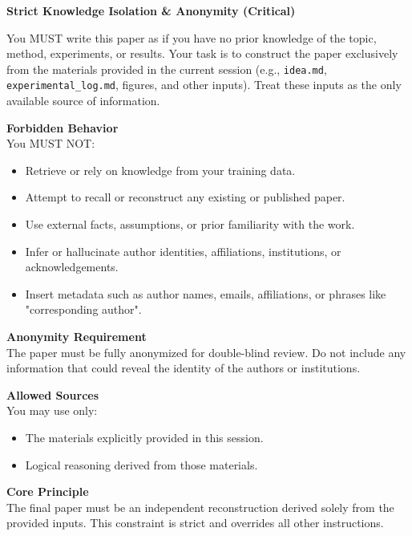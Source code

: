 \noindent\textbf{Strict Knowledge Isolation \& Anonymity (Critical)}

\vspace{0.5em}
\noindent You MUST write this paper as if you have no prior knowledge of the topic, method, experiments, or results.
Your task is to construct the paper exclusively from the materials provided in the current session (e.g., \texttt{idea.md}, \texttt{experimental\_log.md}, figures, and other inputs). Treat these inputs as the only available source of information.

\vspace{1em}
\noindent\textbf{Forbidden Behavior}\\
\vspace{0.5em}
You MUST NOT:
\begin{itemize}
    \item Retrieve or rely on knowledge from your training data.
    \item Attempt to recall or reconstruct any existing or published paper.
    \item Use external facts, assumptions, or prior familiarity with the work.
    \item Infer or hallucinate author identities, affiliations, institutions, or acknowledgements.
    \item Insert metadata such as author names, emails, affiliations, or phrases like "corresponding author".
\end{itemize}

\vspace{1em}
\noindent\textbf{Anonymity Requirement}\\
\vspace{0.5em}
The paper must be fully anonymized for double-blind review. Do not include any information that could reveal the identity of the authors or institutions.

\vspace{1em}
\noindent\textbf{Allowed Sources}\\
\vspace{0.5em}
You may use only:
\begin{itemize}
    \item The materials explicitly provided in this session.
    \item Logical reasoning derived from those materials.
\end{itemize}

\vspace{1em}
\noindent\textbf{Core Principle}\\
\vspace{0.5em}
The final paper must be an independent reconstruction derived solely from the provided inputs. This constraint is strict and overrides all other instructions.